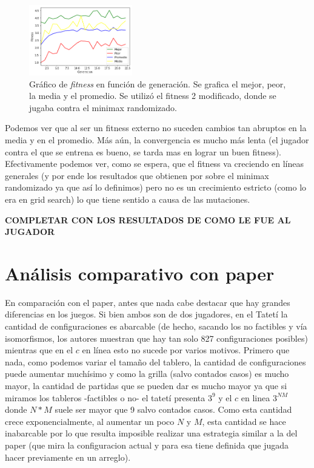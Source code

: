 \documentclass[A4paper,oneside,fleqn,11pt]{article}
\theoremstyle{definition}
\begin{document}
\begin{figure}
	\includegraphics[width=0.4\textwidth]{GenBack.png}
	\caption{ Gráfico de \textit{fitness} en función de generación. Se grafica el mejor, peor, la media y el promedio. Se utilizó el fitness 2 modificado, donde se jugaba contra el minimax randomizado.}
\end{figure}

Podemos ver que al ser un fitness externo no suceden cambios tan abruptos en la media y en el promedio. Más aún, la convergencia es mucho más lenta (el jugador contra el que se entrena es bueno, se tarda mas en lograr un buen fitness). Efectivamente  podemos ver, como se espera, que el fitness va creciendo en líneas generales (y por ende los resultados que obtienen por sobre el minimax randomizado ya que así lo definimos) pero no es un crecimiento estricto (como lo era en grid search) lo que tiene sentido a causa de las mutaciones.

\textbf{COMPLETAR CON LOS RESULTADOS DE COMO LE FUE AL JUGADOR}



\section{Análisis comparativo con paper}

En comparación con el paper, antes que nada cabe destacar que hay grandes diferencias en los juegos. Si bien ambos son de dos jugadores, en el Tatetí la cantidad de configuraciones es abarcable (de hecho, sacando los no factibles y vía isomorfismos, los autores muestran que hay tan solo 827 configuraciones posibles) mientras que en el $c$ en línea esto no sucede por varios motivos. Primero que nada, como podemos variar el tamaño del tablero, la cantidad de configuraciones puede aumentar muchísimo y como la grilla (salvo contados casos) es mucho mayor, la cantidad de partidas que se pueden dar es mucho mayor ya que si miramos los tableros -factibles o no- el tatetí presenta $3^9$ y el $c$ en linea $3^{NM}$ donde $N*M$ suele ser mayor que 9 salvo contados casos. Como esta cantidad crece exponencialmente, al aumentar un poco $N$ y $M$, esta cantidad se hace inabarcable por lo que resulta imposible realizar una estrategia similar a la del paper (que mira la configuracion actual y para esa tiene definida que jugada hacer previamente en un arreglo).
\end{document}
